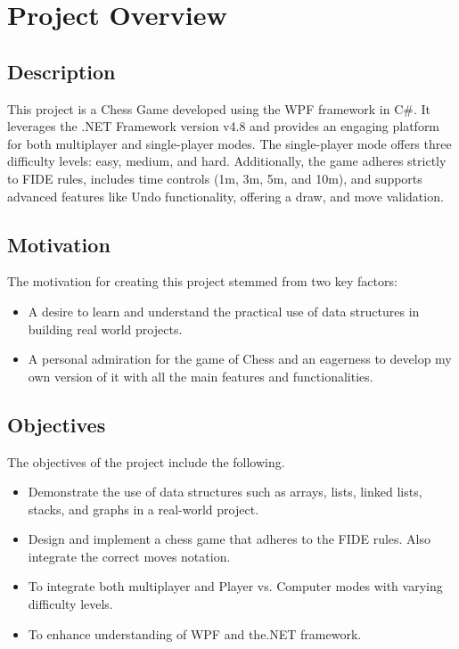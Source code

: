 \documentclass[a4paper,12pt]{article}
\begin{document}
\thispagestyle{empty}

\listoftables

\newpage

\pagestyle{fancy}
\fancyhf{}
\fancyfoot[R]{{\thepage}}

\section{Project Overview}

\subsection{Description}
This project is a Chess Game developed using the WPF framework in C\#. It leverages the .NET Framework version v4.8 and provides an engaging platform for both multiplayer and single-player modes. The single-player mode offers three difficulty levels: easy, medium, and hard. Additionally, the game adheres strictly to FIDE rules, includes time controls (1m, 3m, 5m, and 10m), and supports advanced features like Undo functionality, offering a draw, and move validation. 

\subsection{Motivation}
The motivation for creating this project stemmed from two key factors:
\begin{itemize}
    \item A desire to learn and understand the practical use of data structures in building real world projects.
    \item A personal admiration for the game of Chess and an eagerness to develop my own version of it with all the main features and functionalities.
\end{itemize}

\subsection{Objectives}
The objectives of the project include the following.
\begin{itemize}
    \item Demonstrate the use of data structures such as arrays, lists, linked lists, stacks, and graphs in a real-world project.
    \item Design and implement a chess game that adheres to the FIDE rules. Also integrate the correct moves notation.
    \item To integrate both multiplayer and Player vs. Computer modes with varying difficulty levels.
    \item To enhance understanding of WPF and the.NET framework.
\end{itemize}
\end{document}
